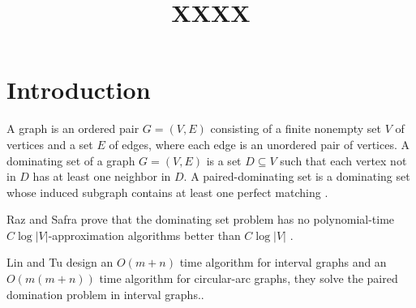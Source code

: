 \documentclass[12pt]{article}
\title{\textbf{XXXX}}
\date{}
\begin{document}
\maketitle

\section{Introduction}
A graph is an ordered pair $G=(V,E)$ consisting of a finite nonempty set $V$ of vertices and a set $E$ of edges, where each edge is an unordered pair of vertices. A dominating set of a graph $G=(V,E)$ is a set $D \subseteq V$ such that each vertex not in $D$ has at least one neighbor in $D$. A paired-dominating set is a dominating set whose induced subgraph contains at least one perfect matching \cite{lamport1}.


Raz and Safra prove that the dominating set problem has no polynomial-time $C \log|V|$-approximation algorithms better than $C\log|V|$  \cite{lamport2}.

Lin and Tu design an $O(m+n)$ time algorithm for interval graphs and an $O(m(m+n))$ time algorithm for circular-arc graphs, they solve the paired domination problem in interval graphs.\cite {lamport3}.







\end{document}
